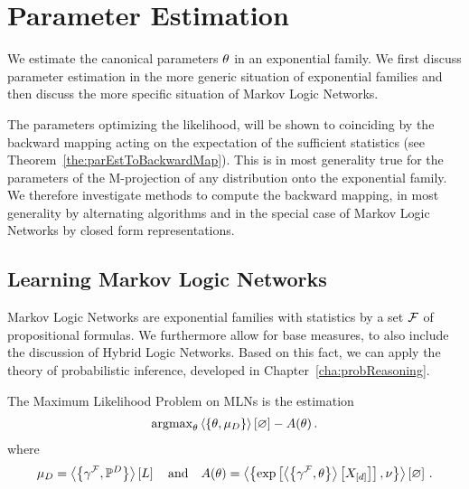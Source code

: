 \section{Parameter Estimation}\label{cha:parameterEstimation}

We estimate the canonical parameters $\theta$ in an exponential family.
We first discuss parameter estimation in the more generic situation of exponential families and then discuss the more specific situation of Markov Logic Networks.

The parameters optimizing the likelihood, will be shown to coinciding by the backward mapping acting on the expectation of the sufficient statistics (see Theorem~\ref{the:parEstToBackwardMap}).
This is in most generality true for the parameters of the M-projection of any distribution onto the exponential family.
We therefore investigate methods to compute the backward mapping, in most generality by alternating algorithms and in the special case of Markov Logic Networks by closed form representations.



\subsection{Learning Markov Logic Networks} %

Markov Logic Networks are exponential families with statistics by a set $\mathcal{F}$ of propositional formulas.
We furthermore allow for base measures, to also include the discussion of Hybrid Logic Networks.
Based on this fact, we can apply the theory of probabilistic inference, developed in Chapter~\ref{cha:probReasoning}.

The Maximum Likelihood Problem on MLNs is the estimation
\begin{align*}
	\mathrm{argmax}_{\theta} 
	\left\langle \left\{\theta,\mu_{D}\right\}\right\rangle \left[ \varnothing \right] - A(\theta) \, . 
\end{align*}
where
\begin{align*}
	\mu_{D} = \left\langle \left\{\gamma^{\mathcal{F}},\mathbb{P}^{D}\right\}\right\rangle \left[ L \right] 
	\quad \text{and} \quad
	A(\theta) = \left\langle \left\{\mathrm{exp}\left[ \left\langle \left\{\gamma^{\mathcal{F}},\theta\right\}\right\rangle \left[ X_{[d]} \right] \right], \nu\right\}\right\rangle \left[ \varnothing \right] \, . 
\end{align*}




